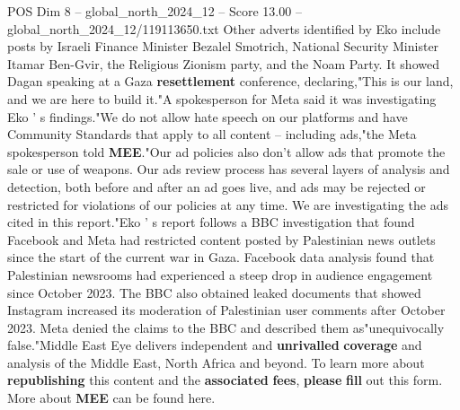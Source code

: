 \begin{textsample}{POS Dim 8 – global\_north\_2024\_12 – Score 13.00 – global\_north\_2024\_12/119113650.txt}
Other adverts identified by Eko include posts by Israeli Finance Minister Bezalel Smotrich, National Security Minister Itamar Ben-Gvir, the Religious Zionism party, and the Noam Party.
It showed Dagan speaking at a Gaza \textbf{resettlement} conference, declaring,"This is our land, and we are here to build it."A spokesperson for Meta said it was investigating Eko ' s findings."We do not allow hate speech on our platforms and have Community Standards that apply to all content -- including ads,"the Meta spokesperson told \textbf{MEE}."Our ad policies also don't allow ads that promote the sale or use of weapons.
Our ads review process has several layers of analysis and detection, both before and after an ad goes live, and ads may be rejected or restricted for violations of our policies at any time.
We are investigating the ads cited in this report."Eko ' s report follows a BBC investigation that found Facebook and Meta had restricted content posted by Palestinian news outlets since the start of the current war in Gaza.
Facebook data analysis found that Palestinian newsrooms had experienced a steep drop in audience engagement since October 2023.
The BBC also obtained leaked documents that showed Instagram increased its moderation of Palestinian user comments after October 2023.
Meta denied the claims to the BBC and described them as"unequivocally false."Middle East Eye delivers independent and \textbf{unrivalled} \textbf{coverage} and analysis of the Middle East, North Africa and beyond.
To learn more about \textbf{republishing} this content and the \textbf{associated} \textbf{fees}, \textbf{please} \textbf{fill} out this form.
More about \textbf{MEE} can be found here.

\end{textsample}
